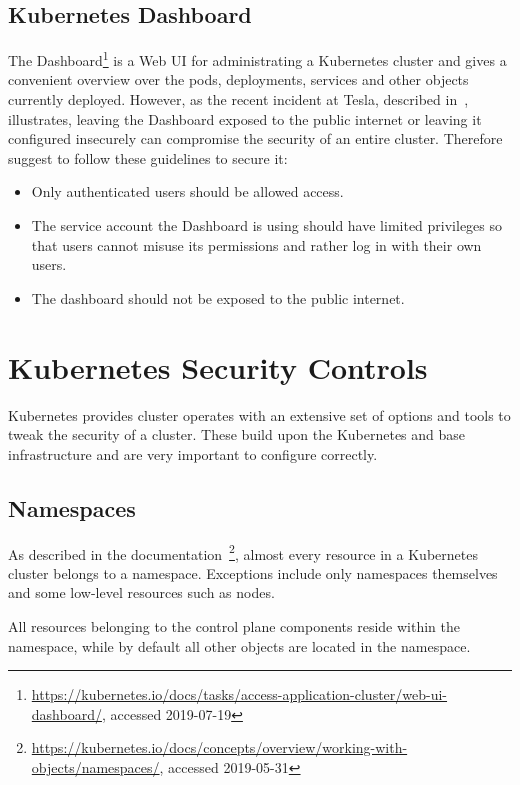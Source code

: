 \subsection{Kubernetes Dashboard}

The Dashboard\footnote{\url{https://kubernetes.io/docs/tasks/access-application-cluster/web-ui-dashboard/}, accessed 2019-07-19} is a Web UI for administrating a Kubernetes cluster and gives a convenient overview over the pods, deployments, services and other objects currently deployed. However, as the recent incident at Tesla, described in~\textcite{teslaLeak}, illustrates, leaving the Dashboard exposed to the public internet or leaving it configured insecurely can compromise the security of an entire cluster. Therefore~\textcite{kubernetessecurity} suggest to follow these guidelines to secure it:

\begin{itemize}
    \item Only authenticated users should be allowed access.
    \item The service account the Dashboard is using should have limited privileges so that users cannot misuse its permissions and rather log in with their own users.
    \item The dashboard should not be exposed to the public internet.
\end{itemize}

\section{Kubernetes Security Controls} \label{sec:layer3}

Kubernetes provides cluster operates with an extensive set of options and tools to tweak the security of a cluster. These build upon the Kubernetes and base infrastructure and are very important to configure correctly. 

\subsection{Namespaces} \label{sec:namespaces}

As described in the documentation~\textcite{k8sdocs}\footnote{\url{https://kubernetes.io/docs/concepts/overview/working-with-objects/namespaces/}, accessed 2019-05-31}, almost every resource in a Kubernetes cluster belongs to a namespace. Exceptions include only namespaces themselves and some low-level resources such as nodes. 

All resources belonging to the control plane components reside within the  namespace, while by default all other objects are located in the  namespace. 

